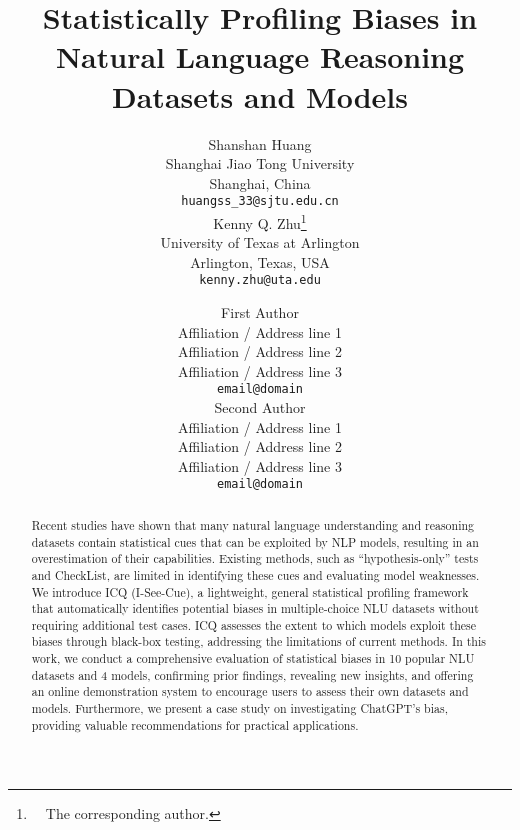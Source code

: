 \documentclass[11pt]{article}
\title{Statistically Profiling Biases in Natural Language Reasoning Datasets and Models}
\author{Shanshan Huang \\ 
        Shanghai Jiao Tong University \\
	Shanghai, China\\
        \texttt{huangss\_33@sjtu.edu.cn} 
        \\\And
        Kenny Q. Zhu\thanks{~~The corresponding author.} \\
        University of Texas at Arlington  \\
	Arlington, Texas, USA\\
        \texttt{kenny.zhu@uta.edu} 
        \\}
\author{First Author \\
  Affiliation / Address line 1 \\
  Affiliation / Address line 2 \\
  Affiliation / Address line 3 \\
  \texttt{email@domain} \\\And
  Second Author \\
  Affiliation / Address line 1 \\
  Affiliation / Address line 2 \\
  Affiliation / Address line 3 \\
  \texttt{email@domain} \\}
\begin{document}
\maketitle
\begin{abstract}
Recent studies have shown that many natural language understanding and reasoning datasets contain statistical cues that can be exploited by NLP models, resulting in an overestimation of their capabilities. Existing methods, 
such as ``hypothesis-only'' tests and CheckList, 
are limited in identifying these cues and evaluating model weaknesses.
We introduce ICQ (I-See-Cue), a lightweight, general statistical profiling framework that automatically identifies potential biases in multiple-choice NLU datasets without requiring additional test cases. ICQ assesses the extent to which models exploit these biases through black-box testing, addressing the limitations of current methods. In this work, we conduct a comprehensive evaluation of statistical biases in 10 popular NLU datasets and 4 models, confirming prior findings, revealing new insights, and offering an online demonstration system to encourage users to assess their own datasets and models.
Furthermore, we present a case study on investigating ChatGPT's bias, providing valuable recommendations for practical applications.



\end{abstract}











\end{document}
